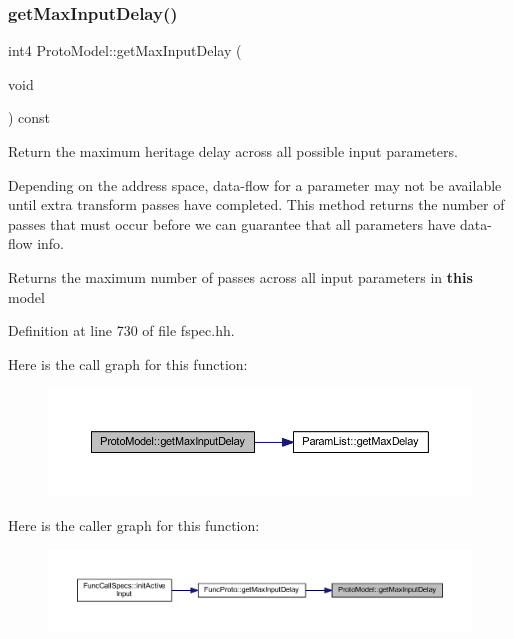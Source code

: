 \subsubsection{\texorpdfstring{getMaxInputDelay()}{getMaxInputDelay()}}
{\footnotesize\ttfamily int4 Proto\+Model\+::get\+Max\+Input\+Delay (\begin{DoxyParamCaption}\item[{void}]{ }\end{DoxyParamCaption}) const\hspace{0.3cm}{\ttfamily [inline]}}



Return the maximum heritage delay across all possible input parameters. 

Depending on the address space, data-\/flow for a parameter may not be available until extra transform passes have completed. This method returns the number of passes that must occur before we can guarantee that all parameters have data-\/flow info. \begin{DoxyReturn}{Returns}
the maximum number of passes across all input parameters in {\bfseries{this}} model 
\end{DoxyReturn}


Definition at line 730 of file fspec.\+hh.

Here is the call graph for this function\+:
\nopagebreak
\begin{figure}[H]
\begin{center}
\leavevmode
\includegraphics[width=350pt]{class_proto_model_a0a6e71fa168f7af91d6b658516a61326_cgraph}
\end{center}
\end{figure}
Here is the caller graph for this function\+:
\nopagebreak
\begin{figure}[H]
\begin{center}
\leavevmode
\includegraphics[width=350pt]{class_proto_model_a0a6e71fa168f7af91d6b658516a61326_icgraph}
\end{center}
\end{figure}
\mbox{\label{class_proto_model_a6692a33595e306f23f23d98093a006bf}} 
